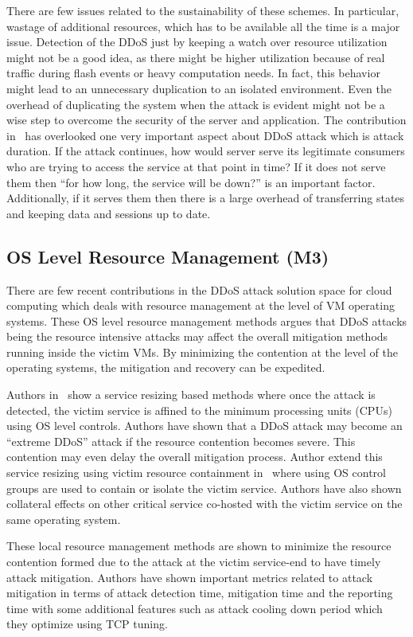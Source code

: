 \documentclass[final,5p,times,twocolumn]{elsarticle}
\begin{document}
{There are few issues related to the sustainability of these schemes. In particular, wastage of additional resources, which has to be available all the time is a major issue. Detection of the DDoS just by keeping a watch over resource utilization might not be a good idea, as there might be higher utilization because of real traffic during flash events or heavy computation needs. In fact, this behavior might lead to an unnecessary duplication to an isolated environment. Even the overhead of duplicating the system when the attack is evident might not be a wise step to overcome the security of the server and application. The contribution in~\cite{defend} has overlooked one very important aspect about DDoS attack which is attack duration. If the attack continues, how would server serve its legitimate consumers who are trying to access the service at that point in time? If it does not serve them then ``for how long, the service will be down?'' is an important factor. Additionally, if it serves them then there is a large overhead of transferring states and keeping data and sessions up to date.}

\subsection{{OS Level Resource Management  (M3)} }
\label{ORM}
{There are few recent contributions in the DDoS attack solution space for cloud computing which deals with resource management at the level of VM operating systems. These OS level resource management methods argues that DDoS attacks being the resource intensive attacks may affect the overall mitigation methods running inside the victim VMs. By minimizing the contention at the level of the operating systems, the mitigation and recovery can be expedited. }

{Authors in~\cite{Annals} show a service resizing based methods where once the attack is detected, the victim service is affined to the minimum processing units (CPUs) using OS level controls. Authors have shown that a DDoS attack may become an ``extreme DDoS'' attack if the resource contention becomes severe. This contention may even delay the overall mitigation process. Author extend this service resizing using victim resource containment in~\cite{VSC} where using OS control groups are used to contain or isolate the victim service. Authors have also shown collateral effects on other critical service co-hosted with the victim service on the same operating system. }

{These local resource management methods are shown to minimize the resource contention formed due to the attack at the victim service-end to have timely attack mitigation. Authors have shown important metrics related to attack mitigation in terms of attack detection time, mitigation time and the reporting time with some additional features such as attack cooling down period which they optimize using TCP tuning. }
\end{document}
